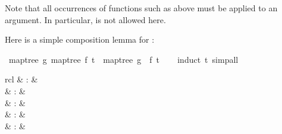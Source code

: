 \begin{isabellebody}
\begin{isamarkuptext}%
Note that all occurrences of functions such as 
  above must be applied to an argument.  In particular,  is not allowed here.%
\end{isamarkuptext}%
\isamarkuptrue%
%
\begin{isamarkuptext}%
Here is a simple composition lemma for :%
\end{isamarkuptext}%
\isamarkuptrue%
\isamarkupfalse%
\ {}map{}tree\ g\ {}map{}tree\ f\ t{}\ {}\ map{}tree\ {}g\ {}\ f{}\ t{}\isanewline
%
\isadelimproof
\ \ %
\endisadelimproof
%
\isatagproof
{}\isamarkupfalse%
\ {}induct\ t{}\ simp{}all%
\endisatagproof
{\isafoldproof}%
%
\isadelimproof
%
\endisadelimproof
%
\isamarkuptrue%
%
\begin{isamarkuptext}%
\begin{matharray}{rcl}
    \hypertarget{method.HOL.pat-completeness}{\hyperlink{method.HOL.pat-completeness}{\mbox{}}} & : &  \\
    \hypertarget{method.HOL.relation}{\hyperlink{method.HOL.relation}{\mbox{}}} & : &  \\
    \hypertarget{method.HOL.lexicographic-order}{\hyperlink{method.HOL.lexicographic-order}{\mbox{}}} & : &  \\
    \hypertarget{method.HOL.size-change}{\hyperlink{method.HOL.size-change}{\mbox{}}} & : &  \\
    \hypertarget{method.HOL.induction-schema}{\hyperlink{method.HOL.induction-schema}{\mbox{}}} & : &  \\
  \end{matharray}


\end{isamarkuptext}
\end{isabellebody}
